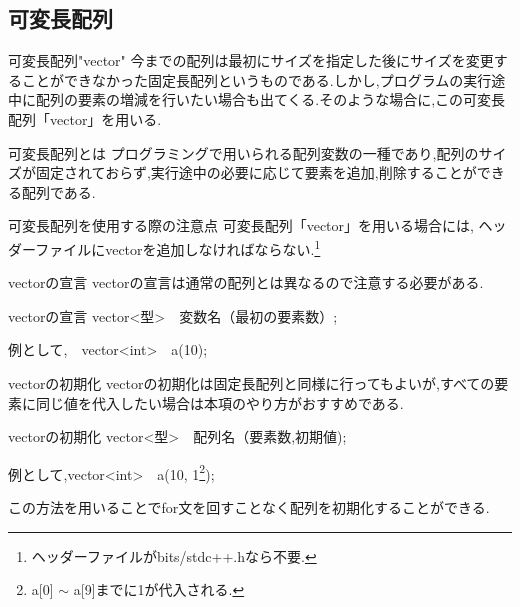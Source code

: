 \subsection{可変長配列}
\begin{frame}{可変長配列"vector"}
    今までの配列は最初にサイズを指定した後にサイズを変更することができなかった固定長配列というものである.しかし,プログラムの実行途中に配列の要素の増減を行いたい場合も出てくる.そのような場合に,この可変長配列「vector」を用いる.
    \begin{block}{可変長配列とは}
        プログラミングで用いられる配列変数の一種であり,配列のサイズが固定されておらず,実行途中の必要に応じて要素を追加,削除することができる配列である.
    \end{block}
    \begin{alertblock}{可変長配列を使用する際の注意点}
        可変長配列「vector」を用いる場合には,
        ヘッダーファイルにvectorを追加しなければならない.\footnote{ヘッダーファイルがbits/stdc++.hなら不要.}
    \end{alertblock}
\end{frame}

\begin{frame}{vectorの宣言}
    vectorの宣言は通常の配列とは異なるので注意する必要がある.
    \begin{block}{vectorの宣言}
    vector<型>　変数名（最初の要素数）;

    例として,　vector<int>　a(10);
    \end{block}
\end{frame}

\begin{frame}{vectorの初期化}
    vectorの初期化は固定長配列と同様に行ってもよいが,すべての要素に同じ値を代入したい場合は本項のやり方がおすすめである.
    \begin{block}{vectorの初期化}
        vector<型>　配列名（要素数,初期値);

        例として,vector<int>　a(10, 1\footnote{a[0] $\sim$ a[9]までに1が代入される.});
    \end{block}
    この方法を用いることでfor文を回すことなく配列を初期化することができる.
    
\end{frame}

